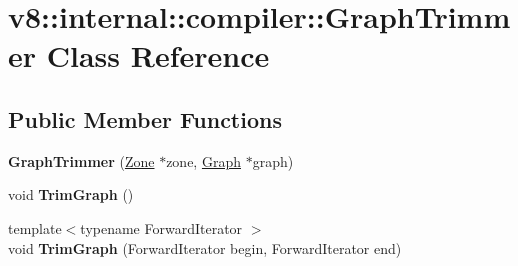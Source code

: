\hypertarget{classv8_1_1internal_1_1compiler_1_1_graph_trimmer}{}\section{v8\+:\+:internal\+:\+:compiler\+:\+:Graph\+Trimmer Class Reference}
\label{classv8_1_1internal_1_1compiler_1_1_graph_trimmer}
\subsection*{Public Member Functions}
\begin{DoxyCompactItemize}
\item 
{\bfseries Graph\+Trimmer} (\hyperlink{classv8_1_1internal_1_1_zone}{Zone} $\ast$zone, \hyperlink{classv8_1_1internal_1_1compiler_1_1_graph}{Graph} $\ast$graph)\hypertarget{classv8_1_1internal_1_1compiler_1_1_graph_trimmer_a4fc6717624c150af0b0977774c6e20a9}{}\label{classv8_1_1internal_1_1compiler_1_1_graph_trimmer_a4fc6717624c150af0b0977774c6e20a9}

\item 
void {\bfseries Trim\+Graph} ()\hypertarget{classv8_1_1internal_1_1compiler_1_1_graph_trimmer_afdbaeba88b2dbf5a1dfdef3e70226a18}{}\label{classv8_1_1internal_1_1compiler_1_1_graph_trimmer_afdbaeba88b2dbf5a1dfdef3e70226a18}

\item 
{\footnotesize template$<$typename Forward\+Iterator $>$ }\\void {\bfseries Trim\+Graph} (Forward\+Iterator begin, Forward\+Iterator end)\hypertarget{classv8_1_1internal_1_1compiler_1_1_graph_trimmer_ab9e55dcb8d7e33ff7d9d5b3019165dc3}{}\label{classv8_1_1internal_1_1compiler_1_1_graph_trimmer_ab9e55dcb8d7e33ff7d9d5b3019165dc3}

\end{DoxyCompactItemize}
